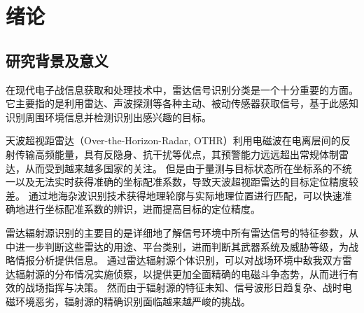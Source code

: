 
\chapter{绪论}
\label{sec:intro}
\section{研究背景及意义}








在现代电子战信息获取和处理技术中，雷达信号识别分类是一个十分重要的方面。它主要指的是利用雷达、声波探测等各种主动、被动传感器获取信号，基于此感知识别周围环境信息并检测识别出感兴趣的目标。

天波超视距雷达（Over-the-Horizon-Radar, OTHR）利用电磁波在电离层间的反射传输高频能量，具有反隐身、抗干扰等优点，其预警能力远远超出常规体制雷达，从而受到越来越多国家的关注。
但是由于量测与目标状态所在坐标系的不统一以及无法实时获得准确的坐标配准系数，导致天波超视距雷达的目标定位精度较差。
通过地海杂波识别技术获得地理轮廓与实际地理位置进行匹配，可以快速准确地进行坐标配准系数的辨识，进而提高目标的定位精度。

雷达辐射源识别的主要目的是详细地了解信号环境中所有雷达信号的特征参数，从中进一步判断这些雷达的用途、平台类别，进而判断其武器系统及威胁等级，为战略情报分析提供信息。
通过雷达辐射源个体识别，可以对战场环境中敌我双方雷达辐射源的分布情况实施侦察，以提供更加全面精确的电磁斗争态势，从而进行有效的战场指挥与决策。
然而由于辐射源的特征未知、信号波形日趋复杂、战时电磁环境恶劣，辐射源的精确识别面临越来越严峻的挑战。

